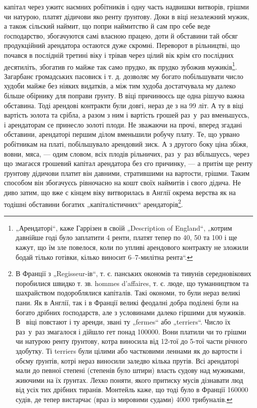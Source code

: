 \parcont{}
капітал через ужитє наємних робітників і одну часть надвишки витворів, грішми чи натурою, платят
дідичови яко ренту ґрунтову. Доки в  віці незалежний мужик, а також сільский наймит, що попри
наймитство й сам про себе веде ґосподарство, збогачуются самі власною працею, доти й обставини тай
обсяг продукційний арендатора остаются дуже скромні. Переворот в рільництві, що почався в послідній
третині  віку і трівав через цілий  вік крім єго послідних десятиліть, збогатив го майже так
само прудко, як прудко зубожив мужиків\footnote{
„Арендаторі“, каже Гаррізен в своїй „Description of England“, „котрим давнійше годі було
заплатити 4 ренти, платят тепер по 40, 50 та 100 і ще кажут, що їм зле повелося, коли
по упливі арендового контракту не зложили бодай тілько готівки, кілько виносит 6--7-милітна рента“.
}. Загарбанє громадських пасовиск і т. д. дозволяє му
богато побільшувати число худоби майже без ніяких видатків, а між тим худоба достатчувала му далеко
більше обірнику для поправи ґрунту. В  віці причинюєсь ще одна рішучо важна обставина. Тоді
арендові контракти були довгі, нераз де з на 99 літ. А ту в  віці вартість золота та срібла, а
разом з ним і вартість грошей раз~у~раз вменьшуєсь, і арендаторам се принесло золоті плоди. Не
зважаючи на прочі, вперед згадані обставини, арендаторі першим ділом вменьшили робучу плату. Те, що
урвано робітникам на платі, побільшувало
арендовий зиск. А з другого боку ціна збіжя, вовни, мяса, — одим словом, всіх плодів рільничих,
раз~у~раз вбільшуєсь, через що змагаєся грошевий капітал арендатора
без єго причинку, — а притім ще ренту ґрунтову дідичови платит він давними, стратившими на вартости,
грішми. Таким способом він збогачуєсь рівночасно на кошт своїх наймитів і свого дідича. Не диво
затим, що вже с кінцем  віку витворилась в Англії окрема верства як на тодішні
обставини богатих „капіталістичних“ арендаторів\footnote{
В Франції з „Regisseur-ів“, т. є. панських окономів та тивунів середновікових поробилися швидко
т. зв. hommes d'affaires, т. є. люде, що туманництвом та шахрайством подороблялися капіталів. Такі
окономи, то були нераз великі пани. Як в Англії, так і в Франції великі феодалні добра поділені були
на богато дрібних ґосподарств, але з условинами далеко гіршими для мужиків. В~ віці повстают і ту
аренди, звані ту „fermes“ або „terriers“. Число їх раз~у~раз змагалося і дійшло гет понад
\num{100000}. Вони платили чи то грішми чи натурою ренту ґрунтову, котра виносила від 12-тої до 5-тої
части річного здобутку. Ті terriers були цілими або частковими леннами як до вартости і обєму
ґрунтів, котрі нераз виносили заледво кілька прутів. Всі арендаторі мали до певної степені (степенів
було штири) власть судову над мужиками, жиючими
на їх ґрунтах. Лехко поняти, якого притиску мусів дізнавати люд від
усіх тих дрібних тиранів. Монтейль каже, що тоді було в Франції \num{160000}
судів, де тепер вистарчає (враз із мировими судами) 4000 трибуналів.
}.

